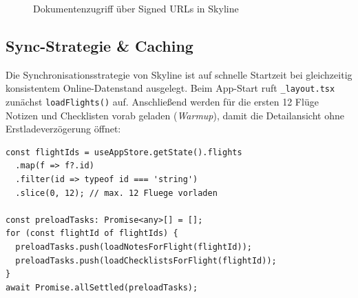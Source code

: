 \begin{figure}[H]
  \centering
  \caption{Dokumentenzugriff über Signed URLs in Skyline}
  \label{fig:signed_url_flow}
\end{figure}

\subsection{Sync-Strategie \& Caching}

Die Synchronisationsstrategie von Skyline ist auf schnelle Startzeit bei gleichzeitig
konsistentem Online-Datenstand ausgelegt.
Beim App-Start ruft \texttt{\_layout.tsx} zunächst \texttt{loadFlights()} auf.
Anschließend werden für die ersten 12 Flüge Notizen und Checklisten vorab geladen
(\emph{Warmup}), damit die Detailansicht ohne Erstladeverzögerung öffnet:

\begin{lstlisting}[style=skyline-ts,
  caption={Warmup beim App-Start: paralleles Vorladen von Notes und Checklists
           (app/\_layout.tsx)},
  label={lst:warmup}]
const flightIds = useAppStore.getState().flights
  .map(f => f?.id)
  .filter(id => typeof id === 'string')
  .slice(0, 12); // max. 12 Fluege vorladen

const preloadTasks: Promise<any>[] = [];
for (const flightId of flightIds) {
  preloadTasks.push(loadNotesForFlight(flightId));
  preloadTasks.push(loadChecklistsForFlight(flightId));
}
await Promise.allSettled(preloadTasks);
\end{lstlisting}

